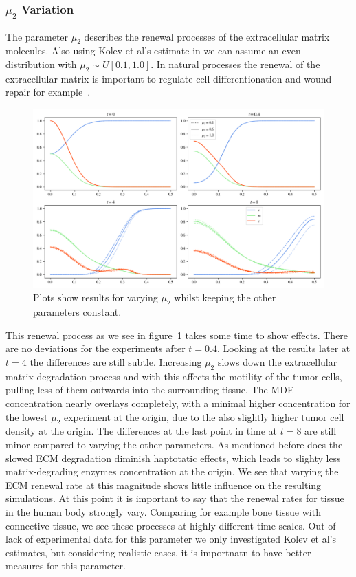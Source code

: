 \subsubsection*{$\mu_2$ Variation}
The parameter $\mu_2$ describes the renewal processes of the extracellular matrix molecules. Also using Kolev et al's estimate in \cite{Kolev2010} we can assume an even distribution with $\mu_2 \sim U[0.1, 1.0]$. In natural processes the renewal of the extracellular matrix is important to regulate cell differentionation and wound repair for example~\cite{Lu2011-yt}.
\begin{figure}[h]
    \centering
    \includegraphics[width=\textwidth]{resources/images/prolif_mu_2_variation.png}
    \caption{Plots show results for varying $\mu_2$ whilst keeping the other parameters constant.}
    \label{fig:prolif_mu_2_variation}
\end{figure}
This renewal process as we see in figure~\ref{fig:prolif_mu_2_variation} takes some time to show effects. There are no deviations for the experiments after $t=0.4$.\newline
Looking at the results later at $t=4$ the differences are still subtle. Increasing $\mu_2$ slows down the extracellular matrix degradation process and with this affects the motility of the tumor cells, pulling less of them outwards into the surrounding tissue. The MDE concentration nearly overlays completely, with a minimal higher concentration for the lowest $\mu_2$ experiment at the origin, due to the also slightly higher tumor cell density at the origin.\newline 
The differences at the last point in time at $t=8$ are still minor compared to varying the other parameters. As mentioned before does the slowed ECM degradation diminish haptotatic effects, which leads to slighty less matrix-degrading enzymes concentration at the origin.\newline
We see that varying the ECM renewal rate at this magnitude shows little influence on the resulting simulations.\newline 
At this point it is important to say that the renewal rates for tissue in the human body strongly vary. Comparing for example bone tissue with connective tissue, we see these processes at highly different time scales. Out of lack of experimental data for this parameter we only investigated Kolev et al's estimates, but considering realistic cases, it is importnatn to have better measures for this parameter.

